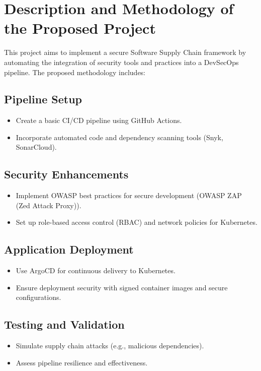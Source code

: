 \documentclass[a4paper,12pt]{article}
\begin{document}
\section{Description and Methodology of the Proposed Project}
This project aims to implement a secure Software Supply Chain framework by automating the integration of security tools and practices into a DevSecOps pipeline. The proposed methodology includes:

\subsection*{Pipeline Setup}
\begin{itemize}
    \item Create a basic CI/CD pipeline using GitHub Actions.
    \item Incorporate automated code and dependency scanning tools (Snyk, SonarCloud).
\end{itemize}

\subsection*{Security Enhancements}
\begin{itemize}
    \item Implement OWASP best practices for secure development (OWASP ZAP (Zed Attack Proxy)).
    \item Set up role-based access control (RBAC) and network policies for Kubernetes.
\end{itemize}

\subsection*{Application Deployment}
\begin{itemize}
    \item Use ArgoCD for continuous delivery to Kubernetes.
    \item Ensure deployment security with signed container images and secure configurations.
\end{itemize}

\subsection*{Testing and Validation}
\begin{itemize}
    \item Simulate supply chain attacks (e.g., malicious dependencies).
    \item Assess pipeline resilience and effectiveness.
\end{itemize}
\end{document}
